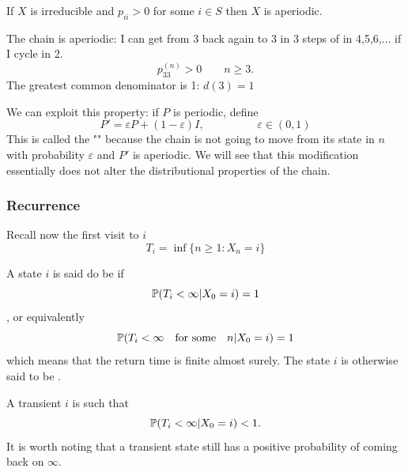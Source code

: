 \documentclass{article}
\begin{document}
\begin{proposition}
    If $X$ is irreducible and $p_{ii}>0$ for some $i \in S$ then $X$ is aperiodic.
\end{proposition}
\begin{example}
     \begin{minipage}{0.5\textwidth}
        \begin{figure}[H]
            \centering
        \end{figure}
    \end{minipage} \hfill
    \begin{minipage}{0.45\textwidth}
        The chain is aperiodic: I can get from 3 back again to 3 in 3 steps of in 4,5,6,$\ldots$ if I cycle in 2.
        \[p_{33}^{(n)}>0\qquad n\geqslant 3.\]
        The greatest common denominator is 1: $d(3)=1$
    \end{minipage}
\end{example}
We can exploit this property: if $P$ is periodic, define
\[
P'=\varepsilon P+(1-\varepsilon)I,\hspace{2cm} \varepsilon\in(0,1)
\]
This is called the "" because the chain is not going to move from its state in $n$ with probability $\varepsilon$ and $P'$ is aperiodic. We will see that this modification essentially does not alter the distributional properties of the chain. 
\subsubsection{Recurrence}
Recall now the first visit to $i$
\[
T_i=\inf\{n\geqslant 1: X_n=i\}
\]

\begin{definition}
    A state $i$ is said do be  if \[\mathbb{P}(T_i<\infty|X_0=i)=1\],  or equivalently \[\mathbb{P}(T_i<\infty \quad\text{for some}\quad n|X_0=i)=1\] which means that the return time is finite almost surely. The state $i$ is otherwise said to be .
\end{definition}
A transient $i$ is such that \[\mathbb{P}(T_i<\infty|X_0=i)<1.\]It is worth noting that a transient state still has a positive probability of coming back on $\infty$.
\end{document}
